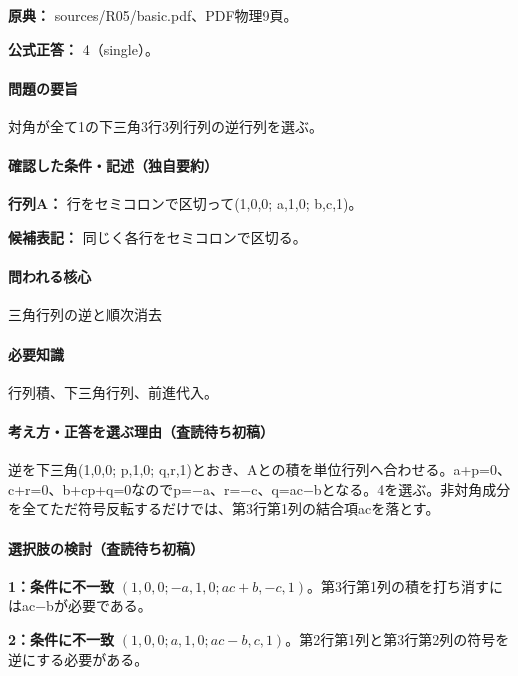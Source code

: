 \noindent\textbf{原典：} sources/R05/basic.pdf、PDF物理9頁。

\textbf{公式正答：} 4（single）。

\paragraph{問題の要旨} 対角が全て1の下三角3行3列行列の逆行列を選ぶ。

\paragraph{確認した条件・記述（独自要約）}\mbox{}\par

\noindent\textbf{行列A：} 行をセミコロンで区切って(1,0,0; a,1,0; b,c,1)。\par

\noindent\textbf{候補表記：} 同じく各行をセミコロンで区切る。\par

\paragraph{問われる核心} 三角行列の逆と順次消去

\paragraph{必要知識} 行列積、下三角行列、前進代入。

\paragraph{考え方・正答を選ぶ理由（査読待ち初稿）} 逆を下三角(1,0,0; p,1,0; q,r,1)とおき、Aとの積を単位行列へ合わせる。a+p=\allowbreak{}0、c+r=\allowbreak{}0、b+cp+q=\allowbreak{}0なのでp=−a、r=−c、q=\allowbreak{}ac−bとなる。4を選ぶ。非対角成分を全てただ符号反転するだけでは、第3行第1列の結合項acを落とす。

\paragraph{選択肢の検討（査読待ち初稿）}\mbox{}\par

\noindent\textbf{1：条件に不一致} \((1,0,0;-a,1,0;ac+b,-c,1)\)。第3行第1列の積を打ち消すにはac−bが必要である。\par

\noindent\textbf{2：条件に不一致} \((1,0,0;a,1,0;ac-b,c,1)\)。第2行第1列と第3行第2列の符号を逆にする必要がある。\par

